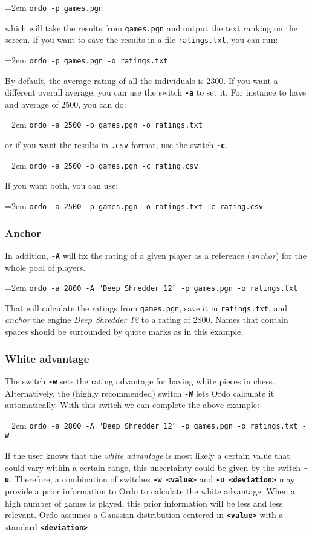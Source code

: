 \documentclass[12pt]{article}
\newcommand{\swtch} [1] {\texttt{\textbf{#1}}}
\newcommand{\filename} [1] {\texttt{#1}}
\newcommand{\cmdln}[1]{
	\par
	\begingroup
		\leftskip=2em
		\addtolength{\rightskip}{0em}
		\noindent \small{\texttt{#1}}
		\par
	\endgroup
}
\begin{document}
	\cmdln{ordo -p games.pgn}

which will take the results from \filename{games.pgn} and output the text ranking on the screen. 
If you want to save the results in a file \filename{ratings.txt}, you can run:

	\cmdln{ordo -p games.pgn -o ratings.txt}

By default, the average rating of all the individuals is 2300. 
If you want a different overall average, you can use the switch \swtch{-a} to set it. 
For instance to have and average of 2500, you can do:
	
	\cmdln{ordo -a 2500 -p games.pgn -o ratings.txt}

or if you want the results in \filename{.csv} format, use the switch \swtch{-c}.

	\cmdln{ordo -a 2500 -p games.pgn -c rating.csv}

If you want both, you can use:

	\cmdln{ordo -a 2500 -p games.pgn -o ratings.txt -c rating.csv}

\subsubsection*{Anchor}
In addition, \swtch{-A} will fix the rating of a given player as a reference (\textit{anchor}) for the whole pool of players.

	\cmdln{ordo -a 2800 -A "Deep Shredder 12" -p games.pgn -o ratings.txt}

That will calculate the ratings from \filename{games.pgn}, save it in \filename{ratings.txt}, and \textit{anchor} the engine \textit{Deep Shredder 12} to a rating of 2800.
Names that contain spaces should be surrounded by quote marks as in this example.

\subsubsection*{White advantage}
The switch \swtch{-w} sets the rating advantage for having white pieces in chess. 
Alternatively, the (highly recommended) switch \swtch{-W} lets Ordo calculate it automatically. 
With this switch we can complete the above example:

\cmdln{ordo -a 2800 -A "Deep Shredder 12" -p games.pgn -o ratings.txt -W}

If the user knows that the \textit{white advantage} is most likely a certain value that could vary within a certain range, this uncertainty could be given by the switch \swtch{-u}. 
Therefore, a combination of switches \swtch{-w <value>} and \swtch{-u <deviation>} may provide a prior information to Ordo to calculate the white advantage.
When a high number of games is played, this prior information will be less and less relevant.
Ordo assumes a Gaussian distribution centered in \swtch{<value>} with a standard \swtch{<deviation>}.
\end{document}
